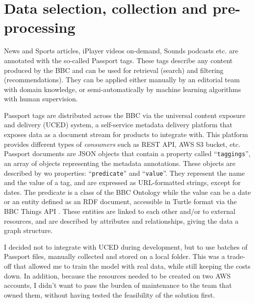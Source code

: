 
\section{Data selection, collection and pre-processing}


News and Sports articles, iPlayer videos on-demand, Sounds podcasts etc. are annotated with the so-called Passport tags.
These tags describe any content produced by the BBC and can be used for retrieval (search) and filtering (recommendations).
They can be applied either manually by an editorial team with domain knowledge,
or semi-automatically by machine learning algorithms with human supervision.

Passport tags are distributed across the BBC via the universal content exposure and delivery (UCED) system,
a self-service metadata delivery platform that exposes data as a document stream for products to integrate with.
This platform provides different types of \textit{consumers} such as REST API, AWS S3 bucket, etc.
Passport documents are JSON objects that contain a property called ``\verb|taggings|'', an array of objects representing the
metadata annotations. These objects are described by wo properties: ``\verb|predicate|'' and ``\verb|value|''. They represent the name and the value of
a tag, and are expressed as URL-formatted strings, except for dates. The predicate is a class of the BBC Ontology \cite{BBC:Ontologies}
while the value can be a date or an entity defined as an RDF \cite{W3C:RDF,W3C:RDF:Concepts} document,
accessible in Turtle format \cite{W3C:Turtle} via the BBC Things API \cite{BBC:Things,BBC:Things:About,BBC:Things:API}.
These entities are linked to each other and/or to external resources, and are described by attributes and relationships, giving the
data a graph structure.


I decided not to integrate with UCED during development, but to use batches of Passport files, manually collected and stored
on a local folder.
This was a trade-off that allowed me to train the model with real data, while still keeping the costs down.
In addition, because the resources needed to
be created on two AWS accounts, I didn't want to pass the burden of maintenance to the team that owned them,
without having tested the feasibility of the solution first.

